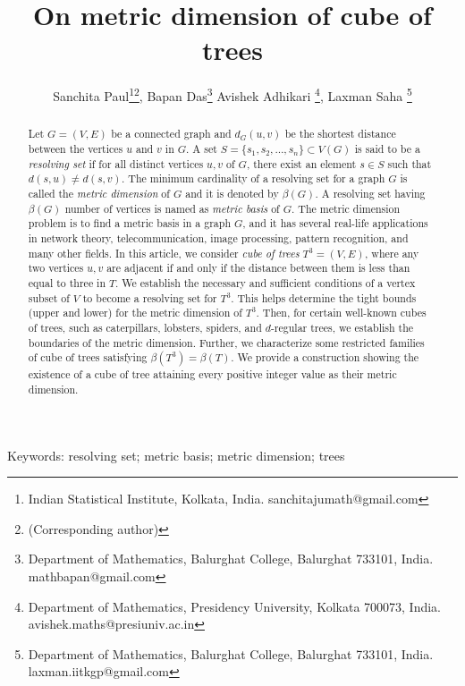 \documentclass{article}
\theoremstyle{definition}
\numberwithin{equation}{section}
\begin{document}
\date{}
\title {On metric dimension of cube of trees}
\author{Sanchita Paul\thanks{Indian Statistical Institute, Kolkata, India. sanchitajumath@gmail.com}\thanks{(Corresponding author)},
Bapan Das\thanks {Department of Mathematics, Balurghat College, Balurghat 733101, India. mathbapan@gmail.com}
Avishek Adhikari \thanks{Department of Mathematics, Presidency University, Kolkata 700073, India. avishek.maths@presiuniv.ac.in},
Laxman Saha \thanks{Department of Mathematics, Balurghat College, Balurghat 733101, India. laxman.iitkgp@gmail.com}}

\maketitle


\begin{abstract}
\noindent
{\footnotesize Let $G=(V,E)$ be a connected graph and $d_{G}(u,v)$ be the shortest distance between the vertices $u$ and $v$ in $G$. A set $S=\{s_{1},s_{2},\hdots,s_{n}\}\subset V(G)$ is said to be a {\em resolving set} if for all distinct vertices $u,v$ of $G$, there exist an element $s\in S$ such that $d(s,u)\neq d(s,v)$. The minimum cardinality of a resolving set for a graph $G$ is called the {\em metric dimension} of $G$ and it is denoted by $\beta{(G)}$. A resolving set having $\beta{(G)}$ number of vertices is named as {\em metric basis} of $G$. The metric dimension problem is to find a metric basis in a graph $G$, and it has several real-life applications in network theory, telecommunication,
image processing, pattern recognition, and many other fields. In this article, we
consider {\em cube of trees} $T^{3}=(V, E)$, where any two vertices $u,v$ are adjacent if and only if the distance between them is less than equal to three in $T$. 
We establish the necessary and sufficient conditions of a vertex subset of $V$ to become a resolving set for $T^{3}$. This helps determine the tight bounds (upper and lower) for the metric dimension of $T^{3}$. Then, for certain well-known cubes of trees, such as caterpillars, lobsters, spiders, and $d$-regular trees, we establish the boundaries of the metric dimension. Further, we characterize some restricted families of cube of trees satisfying 
$\beta{(T^{3})}=\beta{(T)}$. We provide a construction showing the existence of a cube of tree attaining every positive integer value as their metric dimension.
}
\end{abstract}

\noindent
{\scriptsize Keywords:} {\footnotesize resolving set; metric basis; metric dimension; trees}
\end{document}
